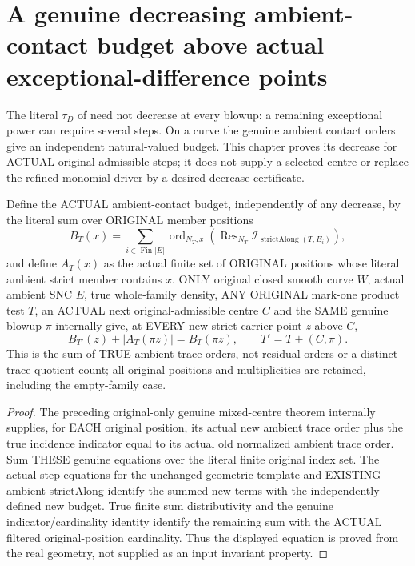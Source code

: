 \section{A genuine decreasing ambient-contact budget above actual exceptional-difference points}

The literal $\tau_D$ of \cite[Lemma~12.8, p.~295]{bierstone-milman97-invent-math}
need not decrease at every blowup: a remaining exceptional power can require
several steps. On a curve the genuine ambient contact orders give an
independent natural-valued budget. This chapter proves its decrease for
ACTUAL original-admissible steps; it does not supply a selected centre or
replace the refined monomial driver by a desired decrease certificate.

\begin{theorem}
\label{hir:sharp-original-curve-actual-ambient-contact-budget-recurrence}
\leanok
Define the ACTUAL ambient-contact budget, independently of any decrease,
by the literal sum over ORIGINAL member positions
\[
 B_T(x)=\sum_{i\in\operatorname{Fin}|E|}
  \operatorname{ord}_{N_T,x}
   (\operatorname{Res}_{N_T}\mathcal I_{\operatorname{strictAlong}(T,E_i)}),
\]
and define $A_T(x)$ as the actual finite set of ORIGINAL positions whose
literal ambient strict member contains $x$.
ONLY original closed smooth curve $W$, actual ambient SNC $E$, true
whole-family density, ANY ORIGINAL mark-one product test $T$, an ACTUAL
next original-admissible centre $C$ and the SAME genuine blowup $\pi$
internally give, at EVERY new strict-carrier point $z$ above $C$,
\[
 B_{T'}(z)+|A_T(\pi z)|=B_T(\pi z),\qquad T'=T\mathbin{+}(C,\pi).
\]
This is the sum of TRUE ambient trace orders, not residual orders or a
distinct-trace quotient count; all original positions and multiplicities
are retained, including the empty-family case.
\end{theorem}
\begin{proof}
The preceding original-only genuine mixed-centre theorem internally
supplies, for EACH original position, its actual new ambient trace order
plus the true incidence indicator equal to its actual old normalized
ambient trace order. Sum THESE genuine equations over the literal finite
original index set. The actual step equations for the unchanged geometric
template and EXISTING ambient strictAlong identify the summed new terms
with the independently defined new budget. True finite sum distributivity
and the genuine indicator/cardinality identity identify the remaining
sum with the ACTUAL filtered original-position cardinality. Thus the
displayed equation is proved from the real geometry, not supplied as an
input invariant property.
\end{proof}

